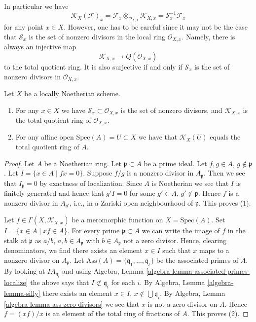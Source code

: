 \noindent
In particular we have
$$
\mathcal{K}_X(\mathcal{F})_x
=
\mathcal{F}_x \otimes_{\mathcal{O}_{X, x}} \mathcal{K}_{X, x}
=
\mathcal{S}_x^{-1}\mathcal{F}_x
$$
for any point $x \in X$. However, one has to be careful since it may
not be the case that $\mathcal{S}_x$ is the set of nonzero divisors
in the local ring $\mathcal{O}_{X, x}$. Namely, there is always
an injective map
$$
\mathcal{K}_{X, x} \longrightarrow Q(\mathcal{O}_{X, x})
$$
to the total quotient ring. It is also surjective if and only if
$\mathcal{S}_x$ is the set of nonzero divisors in $\mathcal{O}_{X, x}$.

\begin{lemma}
\label{lemma-locally-Noetherian-K}
Let $X$ be a locally Noetherian scheme.
\begin{enumerate}
\item For any $x \in X$ we have $\mathcal{S}_x \subset \mathcal{O}_{X, x}$
is the set of nonzero divisors, and $\mathcal{K}_{X, x}$
is the total quotient ring of $\mathcal{O}_{X, x}$.
\item For any affine open $\text{Spec}(A) = U \subset X$ we have
that $\mathcal{K}_X(U)$ equals the total quotient ring of $A$.
\end{enumerate}
\end{lemma}

\begin{proof}
Let $A$ be a Noetherian ring.
Let $\mathfrak p \subset A$ be a prime ideal.
Let $f, g \in A$, $g \not \in \mathfrak p$.
Let $I = \{x \in A \mid fx = 0\}$.
Suppose $f/g$ is a nonzero divisor in $A_{\mathfrak p}$.
Then we see that $I_{\mathfrak p} = 0$ by exactness of
localization. Since $A$ is Noetherian we see that $I$
is finitely generated and hence that $g'I = 0$ for some $g' \in A$,
$g' \not \in \mathfrak p$. Hence $f$ is a nonzero divisor
in $A_{g'}$, i.e., in a Zariski open neighbourhood of $\mathfrak p$.
This proves (1).

\medskip\noindent
Let $f \in \Gamma(X, \mathcal{K}_{X, x})$ be a meromorphic function
on $X = \text{Spec}(A)$. Set $I = \{x \in A \mid xf \in A\}$.
For every prime $\mathfrak p \subset A$ we can write 
the image of $f$ in the stalk at $\mathfrak p$ as
$a/b$, $a, b \in A_{\mathfrak p}$ with $b \in A_{\mathfrak p}$
not a zero divisor. Hence, clearing denominators, we find there exists
an element $x \in I$ such that $x$ maps to a nonzero divisor on
$A_{\mathfrak p}$. Let
$\text{Ass}(A) = \{\mathfrak q_1, \ldots, \mathfrak q_t\}$ be the
associated primes of $A$. By looking at $IA_{\mathfrak q_i}$ and
using Algebra, Lemma \ref{algebra-lemma-associated-primes-localize}
the above says that
$I \not \subset \mathfrak q_i$ for each $i$. By
Algebra, Lemma \ref{algebra-lemma-silly}
there exists an element $x \in I$, $x \not \in \bigcup \mathfrak q_i$.
By Algebra, Lemma \ref{algebra-lemma-ass-zero-divisors}
we see that $x$ is not a zero divisor on $A$.
Hence $f = (xf)/x$ is an element of the total ring of fractions of $A$.
This proves (2).
\end{proof}

